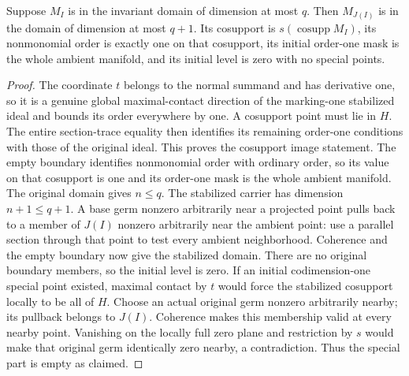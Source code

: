 \begin{lemma}
\label{hir:disjoint-coherent-normal-initial-regime}
\leanok
Suppose $M_I$ is in the invariant domain of dimension at most $q$.
Then $M_{J(I)}$ is in the domain of dimension at most $q+1$. Its cosupport
is $s(\operatorname{cosupp}M_I)$, its nonmonomial order is exactly one on
that cosupport, its initial order-one mask is the whole ambient manifold,
and its initial level is zero with no special points.
\end{lemma}
\begin{proof}
The coordinate $t$ belongs to the normal summand and has derivative one,
so it is a genuine global maximal-contact direction of the marking-one
stabilized ideal and bounds its order everywhere by one. A cosupport point
must lie in $H$. The entire section-trace equality then identifies its
remaining order-one conditions with those of the original ideal. This
proves the cosupport image statement. The empty boundary identifies
nonmonomial order with ordinary order, so its value on that cosupport is
one and its order-one mask is the whole ambient manifold.
The original domain gives $n\le q$. The stabilized carrier has dimension
$n+1\le q+1$. A base germ nonzero arbitrarily near a projected point pulls
back to a member of $J(I)$ nonzero arbitrarily near the ambient point:
use a parallel section through that point to test every ambient
neighborhood. Coherence and the empty boundary now give the stabilized
domain. There are no original boundary members, so the initial level is
zero. If an initial codimension-one special point existed, maximal contact
by $t$ would force the stabilized cosupport locally to be all of $H$.
Choose an actual original germ nonzero arbitrarily nearby; its pullback
belongs to $J(I)$. Coherence makes this membership valid at every nearby
point. Vanishing on the locally full zero plane and restriction by $s$
would make that original germ identically zero nearby, a contradiction.
Thus the special part is empty as claimed.
\end{proof}


